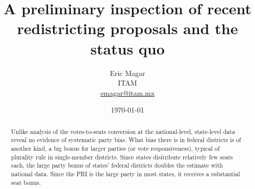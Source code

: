 \documentclass[letter,12pt]{article}
\begin{document}
\title{A preliminary inspection of recent \\ 
       redistricting proposals and the status quo}
\author{Eric Magar\\ITAM\\ {\small \url{emagar@itam.mx}}
      }
\date{\today}
\maketitle


\begin{abstract}
  \noindent Unlike analysis of the votes-to-seats conversion at the national-level, state-level data reveal no evidence of systematic party bias. What bias there is in federal districts is of another kind, a big bonus for larger parties (or vote responsiveness), typical of plurality rule in single-member districts. Since states disitribute relatively few seats each, the large party bonus of states' federal districts doubles the estimate with national data. Since the PRI is the large party in most states, it receives a substantial seat bonus.
\end{abstract}
\end{document}
